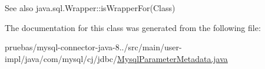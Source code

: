 \begin{DoxySeeAlso}{See also}
java.\+sql.\+Wrapper\+::is\+Wrapper\+For(\+Class) 
\end{DoxySeeAlso}


The documentation for this class was generated from the following file\+:\begin{DoxyCompactItemize}
\item 
pruebas/mysql-\/connector-\/java-\/8../src/main/user-\/impl/java/com/mysql/cj/jdbc/\mbox{\hyperlink{_mysql_parameter_metadata_8java}{Mysql\+Parameter\+Metadata.\+java}}\end{DoxyCompactItemize}
